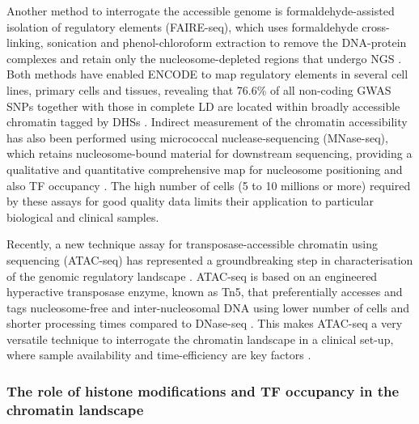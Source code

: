 Another method to interrogate the accessible genome is formaldehyde-assisted isolation of regulatory elements (FAIRE-seq), which uses formaldehyde cross-linking, sonication and phenol-chloroform extraction to remove the DNA-protein complexes and retain only the nucleosome-depleted regions that undergo NGS \parencite{Giresi2006}. Both methods have enabled ENCODE to map regulatory elements in several cell lines, primary cells and tissues, revealing that 76.6\% of all non-coding GWAS SNPs together with those in complete LD are located within broadly accessible chromatin tagged by DHSs \parencite{ENCODE2007,Buck2014,Gaulton2010, Maurano2012}. 
Indirect measurement of the chromatin accessibility has also been performed using micrococcal nuclease-sequencing (MNase-seq), which retains nucleosome-bound material for downstream sequencing, providing a qualitative and quantitative comprehensive map for nucleosome positioning and also TF occupancy \parencite{Axel1975,Ponts2010}. The high number of cells (5 to 10 millions or more) required by these assays for good quality data limits their application to particular biological and clinical samples. 

Recently, a new technique assay for transposase-accessible chromatin using sequencing (ATAC-seq) has represented a groundbreaking step in characterisation of the genomic regulatory landscape \parencite{Buenrostro2013}. ATAC-seq is based on an engineered hyperactive transposase enzyme, known as Tn5, that preferentially accesses and tags nucleosome-free and inter-nucleosomal DNA using lower number of cells and shorter processing times compared to DNase-seq \parencite{Gradman2008, Adey2010}. This makes ATAC-seq a very versatile technique to interrogate the chromatin landscape in a clinical set-up, where sample availability and time-efficiency are key factors \parencite{Scharer2016,Qu2015,Qu2017}. 


\subsubsection{The role of histone modifications and TF occupancy in the chromatin landscape}

